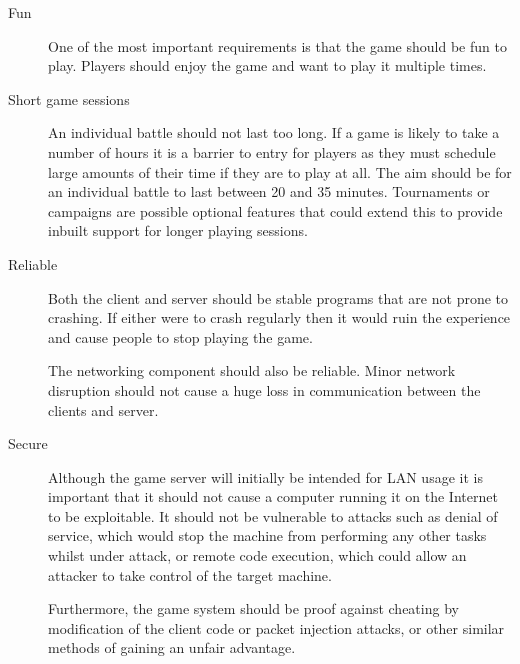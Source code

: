 \begin{description}

	\item[Fun]

	One of the most important requirements is that the game should be fun to play. Players should enjoy the game and want to play it multiple times.

	\item[Short game sessions]

	An individual battle should not last too long. If a game is likely to take a number of hours it is a barrier to entry for players as they must schedule large amounts of their time if they are to play at all. The aim should be for an individual battle to last between 20 and 35 minutes. Tournaments or campaigns are possible optional features that could extend this to provide inbuilt support for longer playing sessions.

	\item[Reliable]

	Both the client and server should be stable programs that are not prone to crashing. If either were to crash regularly then it would ruin the experience and cause people to stop playing the game.

	The networking component should also be reliable. Minor network disruption should not cause a huge loss in communication between the clients and server.

	\item[Secure] 
	
	Although the game server will initially be intended for LAN usage it is important that it should not cause a computer running it on the Internet to be exploitable. It should not be vulnerable to attacks such as denial of service, which would stop the machine from performing any other tasks whilst under attack, or remote code execution, which could allow an attacker to take control of the target machine. 
	
	Furthermore, the game system should be proof against cheating by modification of the client code or packet injection attacks, or other similar methods of gaining an unfair advantage. 


\end{description}

